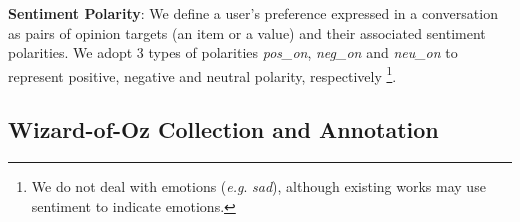 \documentclass[11pt,a4paper]{article}
\makeatletter
\DeclareRobustCommand\onedot{\futurelet\@let@token\@onedot}
\def\onedot{. }
\def\eg{\emph{e.g}\onedot} \def\Eg{\emph{E.g}\onedot}
\makeatother
\begin{document}
\noindent \textbf{Sentiment Polarity}: We define a user's preference expressed in a conversation as 
pairs of opinion targets (an item or a value) and their associated sentiment polarities\cite{hu2004mining}.
We adopt 3 types of polarities \textit{pos\_on}, \textit{neg\_on} and \textit{neu\_on} to represent positive, negative and neutral polarity, respectively
\footnote{We do not deal with emotions (\eg \textit{sad}), although existing works may use sentiment to indicate emotions.}.


\subsection{Wizard-of-Oz Collection and Annotation}
\label{sec:woz}
\end{document}
